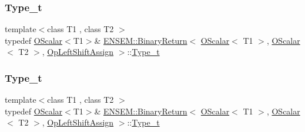 \subsubsection{\texorpdfstring{Type\_t}{Type\_t}\hspace{0.1cm}{\footnotesize\ttfamily [1/3]}}
{\footnotesize\ttfamily template$<$class T1 , class T2 $>$ \\
typedef \mbox{\hyperlink{classENSEM_1_1OScalar}{O\+Scalar}}$<$T1$>$\& \mbox{\hyperlink{structENSEM_1_1BinaryReturn}{E\+N\+S\+E\+M\+::\+Binary\+Return}}$<$ \mbox{\hyperlink{classENSEM_1_1OScalar}{O\+Scalar}}$<$ T1 $>$, \mbox{\hyperlink{classENSEM_1_1OScalar}{O\+Scalar}}$<$ T2 $>$, \mbox{\hyperlink{structENSEM_1_1OpLeftShiftAssign}{Op\+Left\+Shift\+Assign}} $>$\+::\mbox{\hyperlink{structENSEM_1_1BinaryReturn_3_01OScalar_3_01T1_01_4_00_01OScalar_3_01T2_01_4_00_01OpLeftShiftAssign_01_4_aefc8eaf3b370f05aba6b11f335988425}{Type\+\_\+t}}}

\mbox{\label{structENSEM_1_1BinaryReturn_3_01OScalar_3_01T1_01_4_00_01OScalar_3_01T2_01_4_00_01OpLeftShiftAssign_01_4_aefc8eaf3b370f05aba6b11f335988425}} 
\subsubsection{\texorpdfstring{Type\_t}{Type\_t}\hspace{0.1cm}{\footnotesize\ttfamily [2/3]}}
{\footnotesize\ttfamily template$<$class T1 , class T2 $>$ \\
typedef \mbox{\hyperlink{classENSEM_1_1OScalar}{O\+Scalar}}$<$T1$>$\& \mbox{\hyperlink{structENSEM_1_1BinaryReturn}{E\+N\+S\+E\+M\+::\+Binary\+Return}}$<$ \mbox{\hyperlink{classENSEM_1_1OScalar}{O\+Scalar}}$<$ T1 $>$, \mbox{\hyperlink{classENSEM_1_1OScalar}{O\+Scalar}}$<$ T2 $>$, \mbox{\hyperlink{structENSEM_1_1OpLeftShiftAssign}{Op\+Left\+Shift\+Assign}} $>$\+::\mbox{\hyperlink{structENSEM_1_1BinaryReturn_3_01OScalar_3_01T1_01_4_00_01OScalar_3_01T2_01_4_00_01OpLeftShiftAssign_01_4_aefc8eaf3b370f05aba6b11f335988425}{Type\+\_\+t}}}

